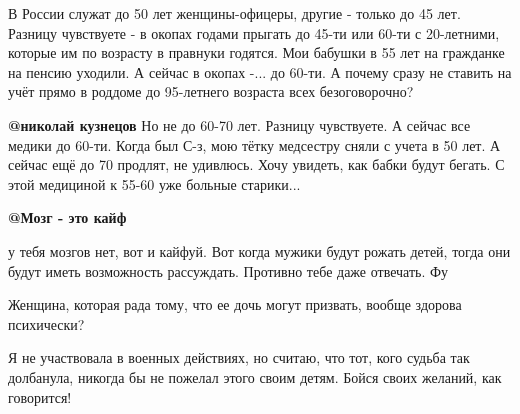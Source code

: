 \begin{itemize}
В России служат до 50 лет женщины-офицеры, другие - только до 45 лет. Разницу
чувствуете - в окопах годами прыгать до 45-ти или 60-ти с 20-летними, которые
им по возрасту в правнуки годятся. Мои бабушки в 55 лет на гражданке на пенсию
уходили. А сейчас в окопах -... до 60-ти. А почему сразу не ставить на учёт
прямо в роддоме до 95-летнего возраста всех безоговорочно?

\textbf{@николай кузнецов}  Но не до 60-70 лет. Разницу чувствуете. А сейчас все медики
до 60-ти. Когда был С-з, мою тётку медсестру сняли с учета в 50 лет. А сейчас
ещё до 70 продлят, не удивлюсь. Хочу увидеть, как бабки будут бегать. С этой
медициной к 55-60 уже больные старики...

\textbf{@Мозг - это кайф}  

у тебя мозгов нет, вот и кайфуй. Вот когда мужики будут рожать детей, тогда они
будут иметь возможность рассуждать. Противно тебе даже отвечать. Фу 


\end{itemize} %


Женщина, которая рада тому, что ее дочь могут призвать, вообще здорова
психически? 

Я не участвовала в военных действиях, но считаю, что тот, кого судьба так
долбанула, никогда бы не пожелал этого своим детям. Бойся своих желаний, как
говорится! 


